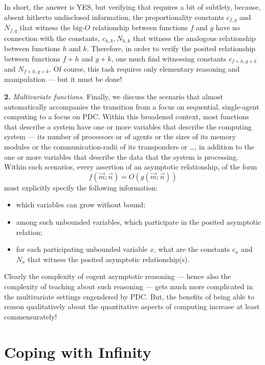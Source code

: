 In short, the answer is YES, but verifying that requires a bit of
subtlety, because, absent hitherto undisclosed information, the
proportionality constants $c_{f,g}$ and $N_{f,g}$ that witness the
big-$O$ relationship between functions $f$ and $g$ have no connection
with the constants, $c_{h,k}, N_{h,k}$ that witness the analogous
relationship between functions $h$ and $k$.  Therefore, in order to
verify the posited relationship between functions $f + h$ and $g + k$,
one much find witnessing constants $c_{f+h, g+k}$ and $N_{f+h,g+k}$.
Of course, this task requires only elementary reasoning and
manipulation --- but it must be done!

{\bf 2.}
{\em Multivariate functions}.
%
Finally, we discuss the scenario that almost automatically accompanies
the transition from a focus on sequential, single-agent computing to a
focus on PDC.  Within this broadened context, most functions that
describe a system have one or more variables that describe the
computing system --- its number of processors or of agents or the
sizes of its memory modules or the communication-radii of its
transponders or \ldots, in addition to the one or more variables that
describe the data that the system is processing.  Within such
scenarios, every assertion of an asymptotic relationship, of the form
\[ f(\vec{m}; \vec{n}) = O(g(\vec{m}; \vec{n})) \]
must explicitly specify the following information:
\begin{itemize}
\item
which variables can grow without bound;
\item
among such unbounded variables, which participate in the posited
asymptotic relation;
\item
for each participating unbounded variable $x$, what are the constants
$c_x$ and $N_x$ that witness the posited asymptotic relationship(s).
\end{itemize}

Clearly the complexity of cogent asymptotic reasoning --- hence also
the complexity of teaching about such reasoning --- gets much more
complicated in the multivariate settings engendered by PDC.  But, the
benefits of being able to reason qualitatively about the quantitative
aspects of computing increase at least commensurately!

\section{Coping with Infinity}
\label{sec:reasoning-infinity}

